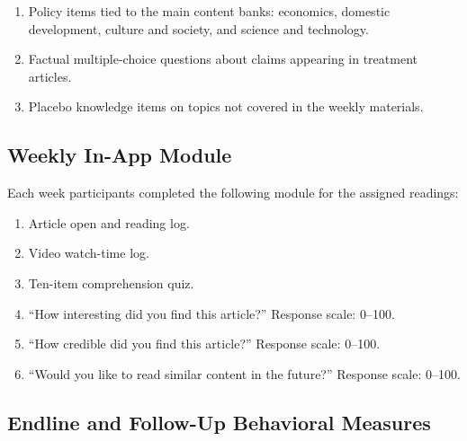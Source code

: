 \documentclass[12pt,american]{article}
\begin{document}
\begin{enumerate}[label=\arabic*., leftmargin=1.5em]
\item Policy items tied to the main content banks: economics, domestic development, culture and society, and science and technology.
\item Factual multiple-choice questions about claims appearing in treatment articles.
\item Placebo knowledge items on topics not covered in the weekly materials.
\end{enumerate}

\subsection{Weekly In-App Module}\label{app:weekly}

Each week participants completed the following module for the assigned readings:

\begin{enumerate}[label=\arabic*., leftmargin=1.5em]
\item Article open and reading log.
\item Video watch-time log.
\item Ten-item comprehension quiz.
\item ``How interesting did you find this article?'' Response scale: 0--100.
\item ``How credible did you find this article?'' Response scale: 0--100.
\item ``Would you like to read similar content in the future?'' Response scale: 0--100.
\end{enumerate}

\subsection{Endline and Follow-Up Behavioral Measures}\label{app:endline}
\end{document}
